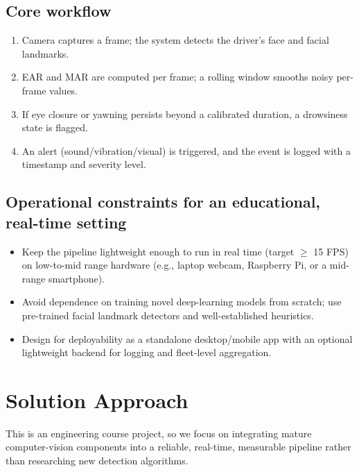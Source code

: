 \documentclass[11pt,a4paper]{article}
\begin{document}
\subsection{Core workflow}
\begin{enumerate}[leftmargin=0.7cm]
    \item Camera captures a frame; the system detects the driver's face and facial landmarks.
    \item EAR and MAR are computed per frame; a rolling window smooths noisy per-frame values.
    \item If eye closure or yawning persists beyond a calibrated duration, a drowsiness state is flagged.
    \item An alert (sound/vibration/visual) is triggered, and the event is logged with a timestamp and severity level.
\end{enumerate}

\subsection{Operational constraints for an educational,
  real-time setting}
\begin{itemize}[leftmargin=0.7cm]
    \item Keep the pipeline lightweight enough to run in real time (target $\geq$ 15 FPS) on low-to-mid range hardware (e.g., laptop webcam, Raspberry Pi, or a mid-range smartphone).
    \item Avoid dependence on training novel deep-learning models from scratch; use pre-trained facial landmark detectors and well-established heuristics.
    \item Design for deployability as a standalone desktop/mobile app with an optional lightweight backend for logging and fleet-level aggregation.
\end{itemize}

\section{Solution Approach}
This is an engineering course project, so we focus on
integrating mature computer-vision components into a
reliable, real-time, measurable pipeline rather than
researching new detection algorithms.
\end{document}
